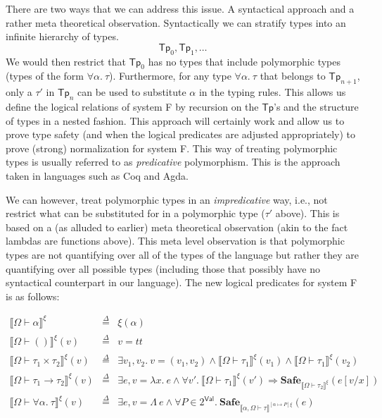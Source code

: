 \documentclass{article}
\newcommand{\TT}{\mathit{tt}}
\newcommand{\VAL}{\mathsf{Val}}
\newcommand{\UNT}{()}
\newcommand{\defeq}{\overset{\Delta}{=}}
\newcommand{\semtyp}[2]{\llbracket #2 \rrbracket_{#1}}
\begin{document}
There are two ways that we can address this issue.
A syntactical approach and a rather meta theoretical observation.
Syntactically we can stratify types into an infinite hierarchy of types.
\[\mathsf{Tp}_0, \mathsf{Tp}_1, \dots\]
We would then restrict that $\mathsf{Tp}_0$ has no types that include polymorphic types (types of the form $\forall \alpha.~\tau$).
Furthermore, for any type $\forall \alpha.~\tau$ that belongs to
$\mathsf{Tp}_{n+1}$, only a $\tau'$ in $\mathsf{Tp}_n$ can be
used to substitute $\alpha$ in the typing rules.
This allows us define the logical relations of system F by recursion on the $\mathsf{Tp}$'s and the structure of types in a
nested fashion.
This approach will certainly work and allow us to prove type safety (and when the logical predicates are adjusted
appropriately) to prove (strong) normalization for system F.
This way of treating polymorphic types is usually referred to
as \emph{predicative} polymorphism.
This is the approach taken in languages such as Coq and Agda.

We can however, treat polymorphic types in an
\emph{impredicative} way, i.e., not restrict what can be
substituted for in a polymorphic type ($\tau'$ above).
This is based on a (as alluded to earlier) meta theoretical
observation (akin to the fact lambdas are functions above).
This meta level observation is that polymorphic types are
not quantifying over all of the types of the language but rather
they are quantifying over all possible types (including those that possibly have no syntactical counterpart in our language).
The new logical predicates for system F is as follows:

\[
\begin{array}{lll}
\semtyp{}{\Omega \vdash \alpha}^{\xi} &\defeq& \xi(\alpha)\\
\semtyp{}{\Omega \vdash \UNT}^{\xi}(v) &\defeq& v = \TT\\
\semtyp{}{\Omega \vdash \tau_1 \times \tau_2}^{\xi}(v) &\defeq& \exists v_1, v_2.~v = (v_1, v_2) \land
\semtyp{}{\Omega \vdash \tau_1}^{\xi}(v_1) \land \semtyp{}{\Omega \vdash \tau_1}^{\xi}(v_2)\\
\semtyp{}{\Omega \vdash \tau_1 \to \tau_2}^{\xi}(v) &\defeq& \exists e, v = \lambda x.~e\land
\forall v'.~\semtyp{}{\Omega \vdash \tau_1}^{\xi}(v') \Rightarrow \mathbf{Safe}_{\semtyp{}{\Omega \vdash \tau_2}^{\xi}}(e[v/x])\\
\semtyp{}{\Omega \vdash \forall \alpha.~\tau}^{\xi}(v) &\defeq& \exists e, v = \Lambda~e\land
\forall P \in 2^{\VAL}.~\mathbf{Safe}_{\semtyp{}{\alpha, \Omega \vdash \tau}^{[\alpha \mapsto P]\xi}}(e)
\end{array}
\]
\end{document}
